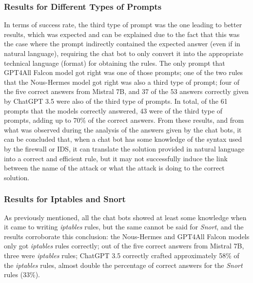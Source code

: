 \documentclass[sigconf]{acmart}
\begin{document}
\subsubsection{Results for Different Types of Prompts}
In terms of success rate, the third type of prompt was the one leading to better results, which was expected and can be explained due to the fact that this was the case where the prompt indirectly contained the expected answer (even if in natural language), requiring the chat bot to only convert it into the appropriate technical language (format) for obtaining the rules. The only prompt that GPT4All Falcon model got right was one of those prompts; one of the two rules that the Nous-Hermes model got right was also a third type of prompt; four of the five correct answers from Mistral 7B, and 37 of the 53 answers correctly given by ChatGPT 3.5 were also of the third type of prompts. In total, of the 61 prompts that the models correctly answered, 43 were of the third type of prompts, adding up to 70\% of the correct answers. From these results, and from what was observed during the analysis of the answers given by the chat bots, it can be concluded that, when a chat bot has some knowledge of the syntax used by the firewall or IDS, it can translate the solution provided in natural language into a correct and efficient rule, but it may not successfully induce the link between the name of the attack or what the attack is doing to the correct solution.

\subsubsection{Results for Iptables and Snort}
As previously mentioned, all the chat bots showed at least some knowledge when it came to writing \textit{iptables} rules, but the same cannot be said for \textit{Snort}, and the results corroborate this conclusion: the Nous-Hermes and GPT4All Falcon models only got \textit{iptables} rules correctly; out of the five correct answers from Mistral 7B, three were \textit{iptables} rules; ChatGPT 3.5 correctly crafted approximately 58\% of the \textit{iptables} rules, almost double the percentage of correct answers for the \textit{Snort} rules (33\%).
\end{document}
